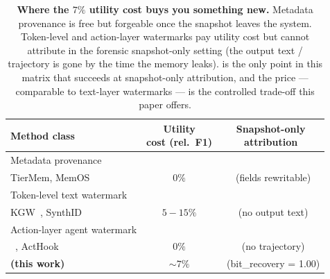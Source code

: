 \begin{table}[t]
\centering
\small
\setlength{\tabcolsep}{4pt}
\renewcommand{\arraystretch}{1.18}
\newcommand{\yes}{\textcolor{ForestGreen!80!black}{\checkmark}}
\newcommand{\no}{\textcolor{red!70!black}{\ding{55}}}
\begin{tabular}{l c c}
\toprule
Method class &
\makecell{Utility \\ cost (rel.\ F1)} &
\makecell{Snapshot-only \\ attribution} \\
\midrule
Metadata provenance \\
\quad TierMem, MemOS                & $0\%$       & \no \, (fields rewritable) \\
\addlinespace[2pt]
Token-level text watermark \\
\quad KGW~\cite{kgw}, SynthID~\cite{synthid} & $5{-}15\%$ & \no \, (no output text) \\
\addlinespace[2pt]
Action-layer agent watermark \\
\quad \agentmark{}~\cite{agentmark}, ActHook~\cite{acthook} & $0\%$ & \no \, (no trajectory) \\
\midrule
\textbf{\memmark{} (this work)}     & $\sim 7\%$  & \yes \, ({bit\_recovery} = 1.00) \\
\bottomrule
\end{tabular}
\caption{\textbf{Where the $7\%$ utility cost buys you something
new.} Metadata provenance is free but forgeable once the
snapshot leaves the system. Token-level and action-layer
watermarks pay utility cost but cannot attribute in the
forensic snapshot-only setting (the output text / trajectory is
gone by the time the memory leaks). \memmark{} is the only point
in this matrix that succeeds at snapshot-only attribution, and
the price — comparable to text-layer watermarks — is the
controlled trade-off this paper offers.}
\label{tab:tradeoff}
\end{table}
